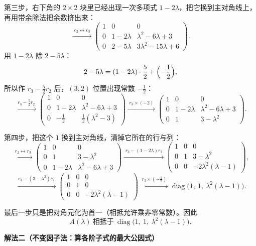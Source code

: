 \begin{example}[求相抵标准形]
第三步，右下角的 \(2\times2\) 块里已经出现一次多项式 \(1-2\lambda\)，把它换到主对角线上，再用带余除法把余数挤出来：
\[
\xrightarrow{\;c_2\leftrightarrow c_3\;}
\begin{pmatrix}
1 & 0 & 0\\
0 & 1-2\lambda & \lambda^2-6\lambda+3\\
0 & 2-5\lambda & 3\lambda^2-15\lambda+6
\end{pmatrix}.
\]
用 \(1-2\lambda\) 除 \(2-5\lambda\)：
\[
2-5\lambda=(1-2\lambda)\cdot\frac52+\Bigl(-\frac12\Bigr),
\]
所以作 \(r_3-\frac52r_2\) 后，\((3,2)\) 位置出现常数 \(-\frac12\)：
\[
\xrightarrow{\;r_3-\frac52r_2\;}
\begin{pmatrix}
1 & 0 & 0\\
0 & 1-2\lambda & \lambda^2-6\lambda+3\\
0 & -\frac12 & \frac12(\lambda^2-3)
\end{pmatrix}
\xrightarrow{\;r_3\times(-2)\;}
\begin{pmatrix}
1 & 0 & 0\\
0 & 1-2\lambda & \lambda^2-6\lambda+3\\
0 & 1 & 3-\lambda^2
\end{pmatrix}.
\]

第四步，把这个 \(1\) 换到主对角线，清掉它所在的行与列：
\[
\xrightarrow{\;r_2\leftrightarrow r_3\;}
\begin{pmatrix}
1 & 0 & 0\\
0 & 1 & 3-\lambda^2\\
0 & 1-2\lambda & \lambda^2-6\lambda+3
\end{pmatrix}
\xrightarrow{\;r_3-(1-2\lambda)r_2\;}
\begin{pmatrix}
1 & 0 & 0\\
0 & 1 & 3-\lambda^2\\
0 & 0 & -2\lambda^2(\lambda-1)
\end{pmatrix},
\]
\[
\xrightarrow{\;c_3-(3-\lambda^2)c_2\;}
\begin{pmatrix}
1 & 0 & 0\\
0 & 1 & 0\\
0 & 0 & -2\lambda^2(\lambda-1)
\end{pmatrix}
\xrightarrow{\;r_3\times(-\frac12)\;}
\operatorname{diag}\bigl(1,\ 1,\ \lambda^2(\lambda-1)\bigr).
\]

最后一步只是把对角元化为首一（相抵允许乘非零常数）。因此
\[
A(\lambda)\ \text{相抵于}\ \operatorname{diag}\bigl(1,\ 1,\ \lambda^2(\lambda-1)\bigr).
\]

\textbf{解法二（不变因子法：算各阶子式的最大公因式）}


\end{example}
